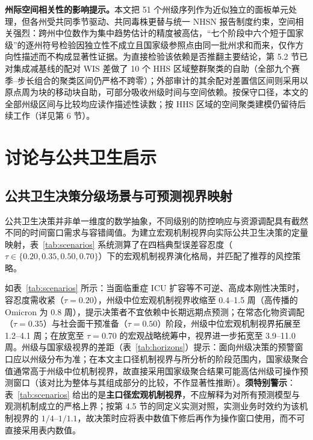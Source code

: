 \documentclass[11pt,a4paper]{article}
\theoremstyle{plain}
\theoremstyle{definition}
\begin{document}
\noindent\textbf{州际空间相关性的影响提示。}本文把 51 个州级序列作为近似独立的面板单元处理，但各州受共同季节驱动、共同毒株更替与统一 NHSN 报告制度约束，空间相关强烈：跨州中位数作为集中趋势估计的精度被高估，“七个阶段中六个短于国家级”的逐州符号检验因独立性不成立且国家级参照点由同一批州求和而来，仅作方向性描述而不构成显著性证据。为直接检验该依赖是否推翻主要结论，第 5.2 节已对集成减基线的配对 WIS 差做了 10 个 HHS 区域整群聚类的自助（全部九个赛季--步长组合的聚类区间仍严格不跨零）；外部审计的其余配对差置信区间则采用以原点周为块的移动块自助，可部分吸收州级时间与空间依赖。按保守口径，本文的全部州级区间与比较均应读作描述性读数；按 HHS 区域的空间聚类建模仍留待后续工作（详见第 6 节）。

\section{讨论与公共卫生启示}\label{sec:discussion}

\subsection{公共卫生决策分级场景与可预测视界映射}

公共卫生决策并非单一维度的数学抽象，不同级别的防控响应与资源调配具有截然不同的时间窗口需求与容错阈值。为建立宏观机制视界向实际公共卫生决策的定量映射，表~\ref{tab:scenarios} 系统测算了在四档典型误差容忍度（$\tau \in \{0.20, 0.35, 0.50, 0.70\}$）下的宏观机制视界演化格局，并匹配了推荐的风控策略。


如表~\ref{tab:scenarios} 所示：当面临重症 ICU 扩容等不可逆、高成本刚性决策时，容忍度需收紧（$\tau = 0.20$），州级中位宏观机制视界收缩至 0.4--1.5 周（高传播的 Omicron 为 0.8 周），提示决策者不宜依赖中长期远期点预测；在常态化物资调配（$\tau = 0.35$）与社会面干预准备（$\tau = 0.50$）阶段，州级中位宏观机制视界拓展至 1.2--4.1 周；在放宽至 $\tau = 0.70$ 的宏观战略统筹中，视界进一步拓宽至 3.9--11.0 周。州级与国家级视界的差距（表~\ref{tab:horizons}）提示：面向州级决策的预警窗口应以州级分布为准；在本文主口径机制视界与所分析的阶段范围内，国家级聚合值通常高于州级中位机制视界，故直接采用国家级聚合结果可能高估州级可操作预测窗口（该对比为整体与其组成部分的比较，不作显著性推断）。\textbf{须特别警示}：表~\ref{tab:scenarios} 给出的是\textbf{主口径宏观机制视界}，不应解释为对所有预测模型与观测机制成立的严格上界；按第 4.5 节的同定义实测对照，实测业务时效约为该机制视界的 $1/4$--$1/1.1$，故决策时应将表中数值下修后再作为操作窗口使用，而不可直接采用表内数值。
\end{document}
